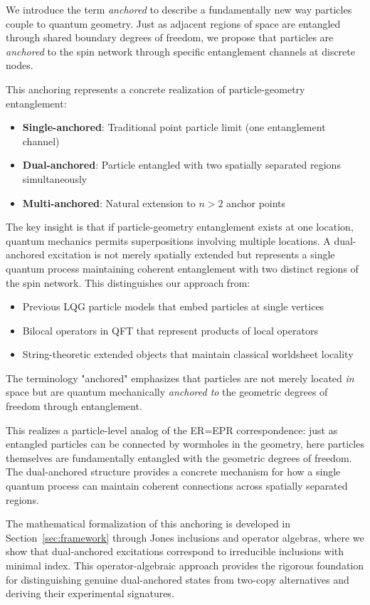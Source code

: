 \documentclass[11pt]{article}
\theoremstyle{plain}
\theoremstyle{definition}
\begin{document}
We introduce the term \emph{anchored} to describe a fundamentally new way particles couple to quantum geometry. Just as adjacent regions of space are entangled through shared boundary degrees of freedom, we propose that particles are \emph{anchored} to the spin network through specific entanglement channels at discrete nodes.

This anchoring represents a concrete realization of particle-geometry entanglement:
\begin{itemize}
  \item \textbf{Single-anchored}: Traditional point particle limit (one entanglement channel)
  \item \textbf{Dual-anchored}: Particle entangled with two spatially separated regions simultaneously
  \item \textbf{Multi-anchored}: Natural extension to $n > 2$ anchor points
\end{itemize}

The key insight is that if particle-geometry entanglement exists at one location, quantum mechanics permits superpositions involving multiple locations. A dual-anchored excitation is not merely spatially extended but represents a single quantum process maintaining coherent entanglement with two distinct regions of the spin network. This distinguishes our approach from:
\begin{itemize}
  \item Previous LQG particle models that embed particles at single vertices
  \item Bilocal operators in QFT that represent products of local operators
  \item String-theoretic extended objects that maintain classical worldsheet locality
\end{itemize}

The terminology "anchored" emphasizes that particles are not merely located \emph{in} space but are quantum mechanically \emph{anchored to} the geometric degrees of freedom through entanglement.

This realizes a particle-level analog of the ER=EPR correspondence: just as entangled particles can be connected by wormholes in the geometry, here particles themselves are fundamentally entangled with the geometric degrees of freedom. The dual-anchored structure provides a concrete mechanism for how a single quantum process can maintain coherent connections across spatially separated regions.

The mathematical formalization of this anchoring is developed in Section~\ref{sec:framework} through Jones inclusions and operator algebras, where we show that dual-anchored excitations correspond to irreducible inclusions with minimal index. This operator-algebraic approach provides the rigorous foundation for distinguishing genuine dual-anchored states from two-copy alternatives and deriving their experimental signatures.
\end{document}
